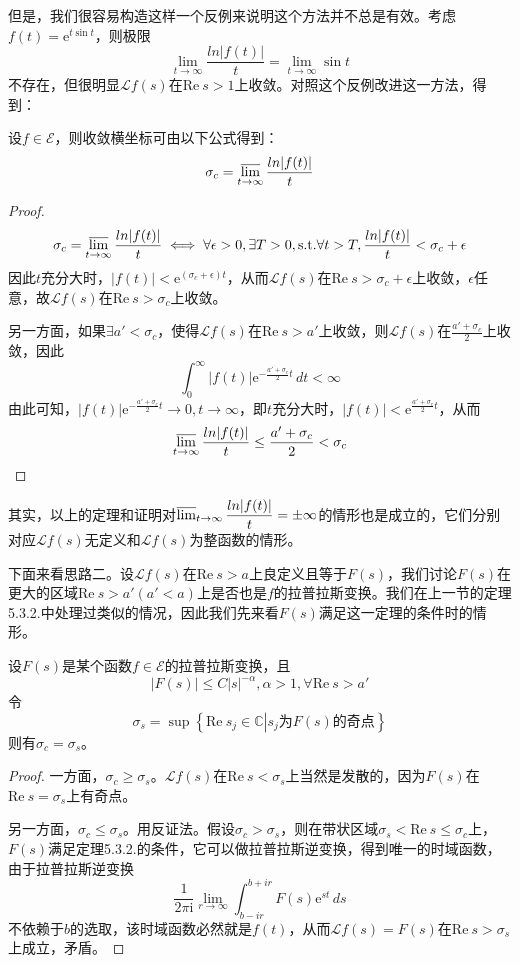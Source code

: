 但是，我们很容易构造这样一个反例来说明这个方法并不总是有效。考虑$f(t)=\mathrm{e}^{t\sin t}$，则极限
$$\lim_{t\to\infty}\frac{ln|f(t)|}{t}=\lim_{t\to\infty}\sin t$$
不存在，但很明显$\mathcal{L} f(s)$在$\text{Re}\ s>1$上收敛。对照这个反例改进这一方法，得到：
\begin{theorem}
    设$f\in\mathcal{E} $，则收敛横坐标可由以下公式得到：
    \[\sigma_c=\varlimsup_{t\to\infty}\frac{ln|f(t)|}{t}\]
\end{theorem}
\begin{proof}
    \[\sigma_c=\varlimsup_{t\to\infty}\frac{ln|f(t)|}{t}\iff \forall \epsilon>0,\exists T>0,\text{s.t.}\forall t>T,\frac{ln|f(t)|}{t}<\sigma_c+\epsilon\]
    因此$t$充分大时，$|f(t)|<\mathrm{e}^{(\sigma_c+\epsilon)t}$，从而$\mathcal{L} f(s)$在$\text{Re}\ s>\sigma_c+\epsilon$上收敛，$\epsilon$任意，故$\mathcal{L} f(s)$在$\text{Re}\ s>\sigma_c$上收敛。

    另一方面，如果$\exists a' <\sigma_c$，使得$\mathcal{L} f(s)$在$\text{Re}\ s>a'$上收敛，则$\mathcal{L} f(s)$在$\frac{a'+\sigma_c}{2}$上收敛，因此
    \[\int_{0}^{\infty}|f(t)|\mathrm{e}^{-\frac{a'+\sigma_c}{2}t}\,dt<\infty\]
    由此可知，$|f(t)|\mathrm{e}^{-\frac{a'+\sigma_c}{2}t}\to 0,t\to\infty$，即$t$充分大时，$|f(t)|<\mathrm{e}^{\frac{a'+\sigma_c}{2}t}$，从而
    \[\varlimsup_{t\to\infty}\frac{ln|f(t)|}{t}\leq \frac{a'+\sigma_c}{2}<\sigma_c\]
\end{proof}

其实，以上的定理和证明对$\varlimsup_{t\to\infty}\dfrac{ln|f(t)|}{t}=\pm\infty$的情形也是成立的，它们分别对应$\mathcal{L} f(s)$无定义和$\mathcal{L} f(s)$为整函数的情形。

下面来看思路二。设$\mathcal{L} f(s)$在$\text{Re}\ s>a$上良定义且等于$F(s)$，我们讨论$F(s)$在更大的区域$\text{Re}\ s>a'(a'<a)$上是否也是$f$的拉普拉斯变换。我们在上一节的定理5.3.2.中处理过类似的情况，因此我们先来看$F(s)$满足这一定理的条件时的情形。

\begin{theorem}
    设$F(s)$是某个函数$f\in\mathcal{E} $的拉普拉斯变换，且
    $$|F(s)|\leq C|s|^{-\alpha},\alpha>1,\forall \text{Re}\ s>a'$$
    令
    \[\sigma_s=\sup\left\{\text{Re}\ s_j\in\mathbb{C}\left|s_j\text{为}F(s)\text{的奇点}\right.\right\}\]
    则有$\sigma_c=\sigma_s$。
\end{theorem}
\begin{proof}
    一方面，$\sigma_c\geq\sigma_s$。$\mathcal{L} f(s)$在$\text{Re}\ s<\sigma_s$上当然是发散的，因为$F(s)$在$\text{Re}\ s=\sigma_s$上有奇点。

    另一方面，$\sigma_c\leq\sigma_s$。用反证法。假设$\sigma_c>\sigma_s$，则在带状区域$\sigma_s<\text{Re}\ s\leq\sigma_c$上，$F(s)$满足定理5.3.2.的条件，它可以做拉普拉斯逆变换，得到唯一的时域函数，由于拉普拉斯逆变换
    $$\frac{1}{2\pi \mathrm{i}}\lim_{r\to\infty}\int_{b-ir}^{b+ir}F(s)\mathrm{e}^{st}\,ds$$
    不依赖于$b$的选取，该时域函数必然就是$f(t)$，从而$\mathcal{L} f(s)=F(s)$在$\text{Re}\ s>\sigma_s$上成立，矛盾。
\end{proof}


